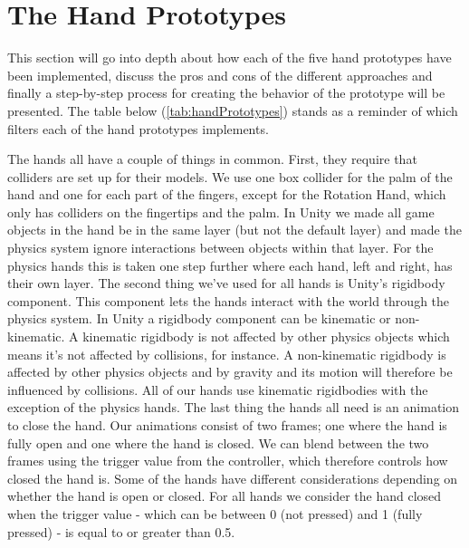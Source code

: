 \section{The Hand Prototypes}
\label{sec:handPrototypes}
This section will go into depth about how each of the five hand prototypes have been implemented, discuss the pros and cons of the different approaches and finally a step-by-step process for creating the behavior of the prototype will be presented. The table below (\ref{tab:handPrototypes}) stands as a reminder of which filters each of the hand prototypes implements.

\begin{table}[H]
\centering
\caption{The hand prototypes and the variables they filter.}
\label{tab:handPrototypes}
\end{table}

The hands all have a couple of things in common. First, they require that colliders are set up for their models. We use one box collider for the palm of the hand and one for each part of the fingers, except for the Rotation Hand, which only has colliders on the fingertips and the palm. In Unity we made all game objects in the hand be in the same layer (but not the default layer) and made the physics system ignore interactions between objects within that layer. For the physics hands this is taken one step further where each hand, left and right, has their own layer. The second thing we've used for all hands is Unity's rigidbody component. This component lets the hands interact with the world through the physics system. In Unity a rigidbody component can be kinematic or non-kinematic. A kinematic rigidbody is not affected by other physics objects which means it's not affected by collisions, for instance. A non-kinematic rigidbody is affected by other physics objects and by gravity and its motion will therefore be influenced by collisions. All of our hands use kinematic rigidbodies with the exception of the physics hands. The last thing the hands all need is an animation to close the hand. Our animations consist of two frames; one where the hand is fully open and one where the hand is closed. We can blend between the two frames using the trigger value from the controller, which therefore controls how closed the hand is. Some of the hands have different considerations depending on whether the hand is open or closed. For all hands we consider the hand closed when the trigger value - which can be between 0 (not pressed) and 1 (fully pressed) - is equal to or greater than 0.5.


